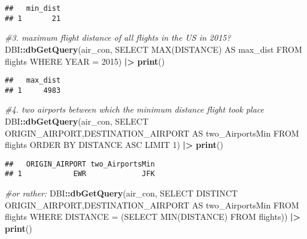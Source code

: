 \documentclass[
]{article}
\newenvironment{Shaded}{\begin{snugshade}}{\end{snugshade}}
\newcommand{\CommentTok}[1]{\textcolor[rgb]{0.56,0.35,0.01}{\textit{#1}}}
\newcommand{\FunctionTok}[1]{\textcolor[rgb]{0.13,0.29,0.53}{\textbf{#1}}}
\newcommand{\NormalTok}[1]{#1}
\newcommand{\SpecialCharTok}[1]{\textcolor[rgb]{0.81,0.36,0.00}{\textbf{#1}}}
\newcommand{\StringTok}[1]{\textcolor[rgb]{0.31,0.60,0.02}{#1}}
\begin{document}
\begin{verbatim}
##   min_dist
## 1       21
\end{verbatim}

\begin{Shaded}
\begin{Highlighting}[]
\CommentTok{\#3. maximum flight distance of all flights in the US in 2015?}
\NormalTok{DBI}\SpecialCharTok{::}\FunctionTok{dbGetQuery}\NormalTok{(air\_con, }\StringTok{\textquotesingle{}SELECT MAX(DISTANCE) AS max\_dist }
\StringTok{           FROM flights }
\StringTok{           WHERE YEAR = 2015\textquotesingle{}}\NormalTok{) }\SpecialCharTok{|\textgreater{}} \FunctionTok{print}\NormalTok{()}
\end{Highlighting}
\end{Shaded}

\begin{verbatim}
##   max_dist
## 1     4983
\end{verbatim}

\begin{Shaded}
\begin{Highlighting}[]
\CommentTok{\#4. two airports between which the minimum distance flight took place}
\NormalTok{DBI}\SpecialCharTok{::}\FunctionTok{dbGetQuery}\NormalTok{(air\_con, }\StringTok{\textquotesingle{}SELECT ORIGIN\_AIRPORT,DESTINATION\_AIRPORT AS two\_AirportsMin            FROM flights }
\StringTok{           ORDER BY DISTANCE ASC}
\StringTok{           LIMIT 1\textquotesingle{}}\NormalTok{) }\SpecialCharTok{|\textgreater{}} \FunctionTok{print}\NormalTok{()}
\end{Highlighting}
\end{Shaded}

\begin{verbatim}
##   ORIGIN_AIRPORT two_AirportsMin
## 1            EWR             JFK
\end{verbatim}

\begin{Shaded}
\begin{Highlighting}[]
\CommentTok{\#or rather:}
\NormalTok{DBI}\SpecialCharTok{::}\FunctionTok{dbGetQuery}\NormalTok{(air\_con, }\StringTok{\textquotesingle{}SELECT DISTINCT ORIGIN\_AIRPORT,DESTINATION\_AIRPORT AS two\_AirportsMin            FROM flights }
\StringTok{           WHERE DISTANCE = (SELECT MIN(DISTANCE) FROM flights)\textquotesingle{}}\NormalTok{) }\SpecialCharTok{|\textgreater{}} \FunctionTok{print}\NormalTok{()}
\end{Highlighting}
\end{Shaded}
\end{document}
